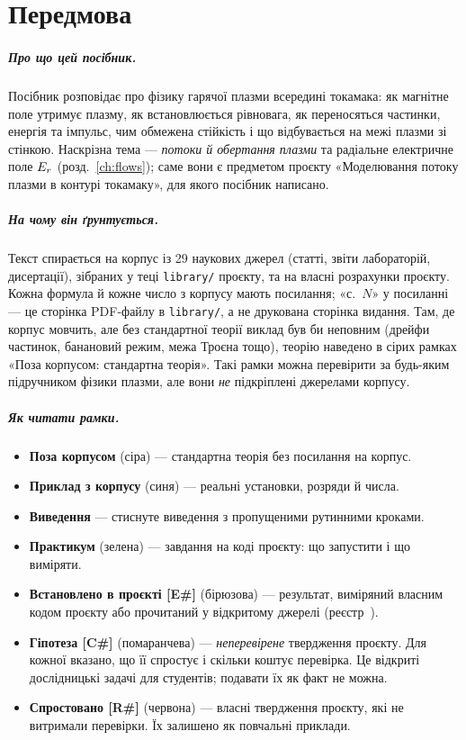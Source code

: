 \chapter*{Передмова}\label{ch:preface}

\paragraph{Про що цей посібник.} Посібник розповідає про фізику гарячої плазми всередині
токамака: як магнітне поле утримує плазму, як встановлюється рівновага, як переносяться
частинки, енергія та імпульс, чим обмежена стійкість і що відбувається на межі плазми зі
стінкою. Наскрізна тема --- \emph{потоки й обертання плазми} та радіальне електричне поле
$E_{r}$ (розд.~\ref{ch:flows}); саме вони є предметом проєкту «Моделювання потоку плазми в
контурі токамаку», для якого посібник написано.

\paragraph{На чому він ґрунтується.} Текст спирається на корпус із 29 наукових джерел
(статті, звіти лабораторій, дисертації), зібраних у теці \texttt{library/} проєкту, та на
власні розрахунки проєкту. Кожна формула й кожне число з корпусу мають посилання; «с.~$N$» у посиланні --- це сторінка PDF-файлу в \texttt{library/}, а не друкована сторінка видання.
Там, де корпус мовчить, але без стандартної теорії виклад був би неповним (дрейфи
частинок, банановий режим, межа Троєна тощо), теорію наведено в сірих рамках
«Поза корпусом: стандартна теорія». Такі рамки можна перевірити за будь-яким
підручником фізики плазми, але вони \emph{не} підкріплені джерелами корпусу.

\paragraph{Як читати рамки.}
\begin{itemize}
  \item \textbf{Поза корпусом} (сіра) --- стандартна теорія без посилання на корпус.
  \item \textbf{Приклад з корпусу} (синя) --- реальні установки, розряди й числа.
  \item \textbf{Виведення} --- стиснуте виведення з пропущеними рутинними кроками.
  \item \textbf{Практикум} (зелена) --- завдання на коді проєкту: що запустити і що виміряти.
  \item \textbf{Встановлено в проєкті [E\#]} (бірюзова) --- результат, виміряний власним
        кодом проєкту або прочитаний у відкритому джерелі (реєстр~\cite{ProjRegisters}).
  \item \textbf{Гіпотеза [C\#]} (помаранчева) --- \emph{неперевірене} твердження проєкту.
        Для кожної вказано, що її спростує і скільки коштує перевірка. Це відкриті
        дослідницькі задачі для студентів; подавати їх як факт не можна.
  \item \textbf{Спростовано [R\#]} (червона) --- власні твердження проєкту, які не
        витримали перевірки. Їх залишено як повчальні приклади.
\end{itemize}

